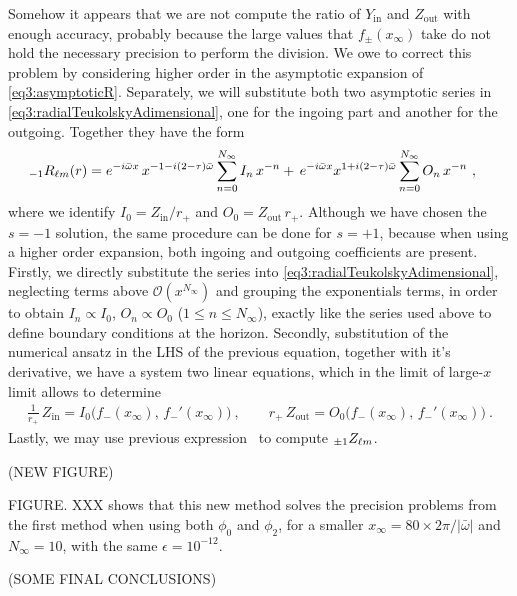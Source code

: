 Somehow it appears that we are not compute the ratio of $Y_\mathrm{in}$ and $Z_\mathrm{out}$ with enough accuracy, probably because the large values that $f_{\pm}(x_\infty)$ take do not hold the necessary precision to perform the division.
We owe to correct this problem by considering higher order in the asymptotic expansion of \eqref{eq3:asymptoticR}.
Separately, we will substitute both two asymptotic series in \eqref{eq3:radialTeukolskyAdimensional}, one for the ingoing part and another for the outgoing.
Together they have the form
\begin{align}
	\label{eq4:radialIOseries}
	\uu[-1]{R}{\ell m}(r) &= e^{-i \bar{\omega} x}  \, x^{ - 1 - i (2-\tau) \bar{\omega} } \sum_{n=0}^{N_\infty} I_n \, x^{-n} + \, e^{-i \bar{\omega} x} x^{ 1 + i (2-\tau) \bar{\omega} } \sum_{n=0}^{N_\infty} O_n \, x^{-n} ~,
\end{align}
where we identify $I_0 = Z_\mathrm{in}/r_{+}$ and $O_0 = Z_\mathrm{out} \,r_{+}$.
Although we have chosen the $s=-1$ solution, the same procedure can be done for $s=+1$, because when using a higher order expansion, both ingoing and outgoing coefficients are present.
Firstly, we directly substitute the series into \eqref{eq3:radialTeukolskyAdimensional}, neglecting terms above $\mathscr{O}(x^{N_\infty})$ and grouping the exponentials terms, in order to obtain $I_n\propto I_0$, $O_n\propto O_0$ ($1 \le n \le N_\infty$), exactly like the series used above to define boundary conditions at the horizon.
Secondly, substitution of the numerical ansatz  in the LHS of the previous equation, together with it's derivative, we have a system two linear equations, which in the limit of large-$x$ limit allows to determine
\begin{align}
	\frac{1}{r_+} \,Z_\mathrm{in} = I_0\Big( f_{-}(x_\infty), \,f_{-}{\!}'(x_\infty) \Big) ~,\qquad r_{+} \,Z_\mathrm{out} = O_0\Big( f_{-}(x_\infty), \, f_{-}{\!}'(x_\infty) \Big) ~.
\end{align}
Lastly, we may use previous expression~ to compute $\uu[\pm1]{Z}{\ell m}$.

(NEW FIGURE)

FIGURE. XXX shows that this new method solves the precision problems from the first method when using both $\phi_0$ and $\phi_2$, for a smaller $x_\infty = 80 \times 2 \pi / |\bar{\omega}|$ and $N_\infty = 10$, with the same $\epsilon = 10^{-12}$.

(SOME FINAL CONCLUSIONS)


\cleardoublepage